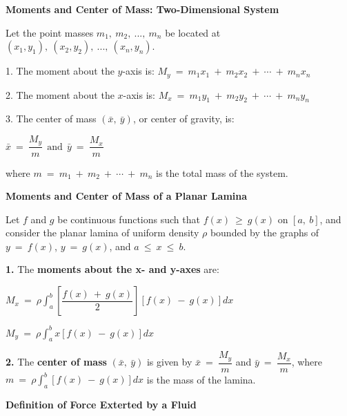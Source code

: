 \documentclass{article}
\begin{document}
\begin{large}
\vspace{0.5in}
\textbf{Moments and Center of Mass: Two-Dimensional System}

\hspace{0.1in} Let the point masses $m_{1},\ m_{2},\ ...,\ m_{n}$ be located at $(x_{1},y_{1}),\ (x_{2},y_{2}),\ ...,\ (x_{n},y_{n})$.

\hspace{0.2in} 1. The moment about the $y$-axis is: $M_{y}\ =\ m_{1}x_{1}\ +\ m_{2}x_{2}\ +\ \cdots\ +\ m_{n}x_{n}$

\hspace{0.2in} 2. The moment about the $x$-axis is: $M_{x}\ =\ m_{1}y_{1}\ +\ m_{2}y_{2}\ +\ \cdots\ +\ m_{n}y_{n}$

\hspace{0.2in} 3. The center of mass $(\bar{x},\ \bar{y})$, or center of gravity, is:

\hspace{2.0in} $\bar{x}\ =\ \dfrac{M_{y}}{m}\ \ \text{and}\ \ \bar{y}\ =\ \dfrac{M_{x}}{m}$

\hspace{0.2in} where $m\ =\ m_{1}\ +\ m_{2}\ +\ \cdots\ +\ m_{n}$ is the total mass of the system.

\textbf{Moments and Center of Mass of a Planar Lamina}

\hspace{0.1in} Let $f$ and $g$ be continuous functions such that $f(x)\ \geq\ g(x)$ on $[a,\ b]$, and consider the planar lamina of uniform density $\rho$ bounded by the graphs of $y\ =\ f(x)$, $y\ =\ g(x)$, and $a\ \leq\ x\ \leq\ b$.

\hspace{0.2in} \textbf{1.} The \textbf{moments about the x- and y-axes} are:

\hspace{0.3in} $M_{x}\ =\ \rho\displaystyle\int^{b}_{a}\left[\dfrac{f(x)\ +\ g(x)}{2}\right][f(x)\ -\ g(x)]dx$

\hspace{0.3in} $M_{y}\ =\ \rho\displaystyle\int^{b}_{a}x[f(x)\ -\ g(x)]dx$

\hspace{0.2in} \textbf{2.} The \textbf{center of mass} $(\bar{x},\ \bar{y})$ is given by $\bar{x}\ =\ \dfrac{M_{y}}{m}$ and $\bar{y}\ =\ \dfrac{M_{x}}{m}$, where $m\ =\ \rho\displaystyle\int^{b}_{a}[f(x)\ -\ g(x)]dx$ is the mass of the lamina.

\vspace{0.8in}
\textbf{Definition of Force Exterted by a Fluid}


\end{large}
\end{document}
